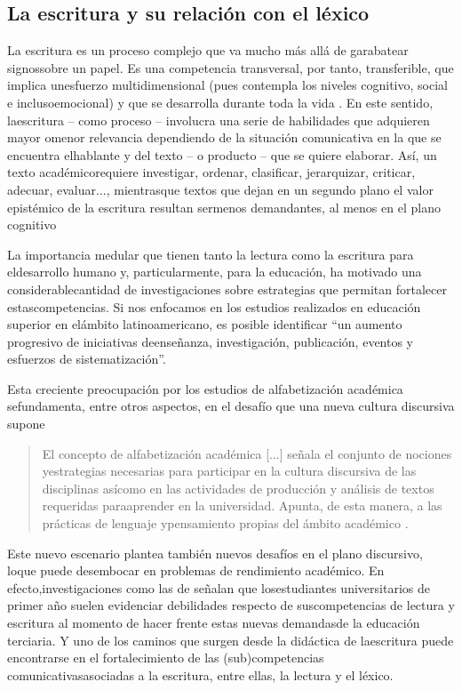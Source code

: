 \documentclass{textolivre}
\begin{document}
\subsection{La escritura y su relación con el léxico}\label{sec-la-escr}
La escritura es un proceso complejo que va mucho más allá de garabatear
signossobre un papel. Es una competencia transversal, por tanto, transferible,
que implica unesfuerzo multidimensional (pues contempla los niveles cognitivo,
social e inclusoemocional) y que se desarrolla durante toda la vida \cite{Balta2018}.
En este sentido, laescritura – como proceso – involucra una serie de
habilidades que adquieren mayor omenor relevancia dependiendo de la situación
comunicativa en la que se encuentra elhablante y del texto – o producto – que
se quiere elaborar. Así, un texto académicorequiere investigar, ordenar,
clasificar, jerarquizar, criticar, adecuar, evaluar..., mientrasque textos que
dejan en un segundo plano el valor epistémico de la escritura resultan sermenos
demandantes, al menos en el plano cognitivo \cite{cantis2013,navarro}

La importancia medular que tienen tanto la lectura como la escritura para
eldesarrollo humano y, particularmente, para la educación, ha motivado una
considerablecantidad de investigaciones sobre estrategias que permitan
fortalecer estascompetencias. Si nos enfocamos en los estudios realizados en
educación superior en elámbito latinoamericano, es posible identificar “un
aumento progresivo de iniciativas deenseñanza, investigación, publicación,
eventos y esfuerzos de sistematización”\cite{Navarro2016}.

Esta creciente preocupación por los estudios de alfabetización académica
sefundamenta, entre otros aspectos, en el desafío que una nueva cultura
discursiva supone
\begin{quote}
El concepto de alfabetización académica [...] señala el conjunto de nociones
yestrategias necesarias para participar en la cultura discursiva de las
disciplinas asícomo en las actividades de producción y análisis de textos
requeridas paraaprender en la universidad. Apunta, de esta manera, a las
prácticas de lenguaje ypensamiento propias del ámbito académico \cite[p. 410]{cantis2003}.
\end{quote}

Este nuevo escenario plantea también nuevos desafíos en el plano discursivo,
loque puede desembocar en problemas de rendimiento académico. En
efecto,investigaciones como las de \textcite{Ayala2019,ValdsLen2020} 
señalan que losestudiantes universitarios de primer año suelen evidenciar
debilidades respecto de suscompetencias de lectura y escritura al momento de
hacer frente estas nuevas demandasde la educación terciaria. Y uno de los
caminos que surgen desde la didáctica de laescritura puede encontrarse en el
fortalecimiento de las (sub)competencias comunicativasasociadas a la escritura,
entre ellas, la lectura y el léxico.
\end{document}
